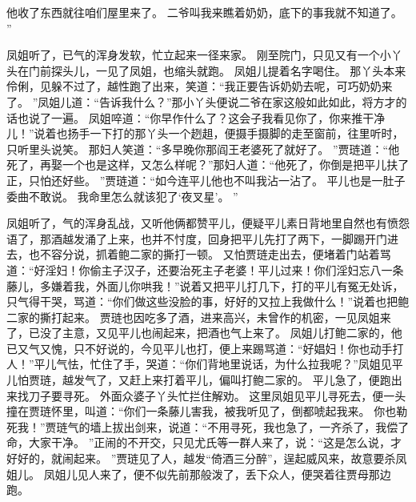 他收了东西就往咱们屋里来了。
二爷叫我来瞧着奶奶，底下的事我就不知道了。
”\par
凤姐听了，已气的浑身发软，忙立起来一径来家。
刚至院门，只见又有一个小丫头在门前探头儿，一见了凤姐，也缩头就跑。
凤姐儿提着名字喝住。
那丫头本来伶俐，见躲不过了，越性跑了出来，笑道：“我正要告诉奶奶去呢，可巧奶奶来了。
”凤姐儿道：“告诉我什么？”那小丫头便说二爷在家这般如此如此，将方才的话也说了一遍。
凤姐啐道：“你早作什么了？这会子我看见你了，你来推干净儿！”说着也扬手一下打的那丫头一个趔趄，便摄手摄脚的走至窗前，往里听时，只听里头说笑。
那妇人笑道：“多早晚你那阎王老婆死了就好了。
”贾琏道：“他死了，再娶一个也是这样，又怎么样呢？”那妇人道：“他死了，你倒是把平儿扶了正，只怕还好些。
”贾琏道：“如今连平儿他也不叫我沾一沾了。
平儿也是一肚子委曲不敢说。
我命里怎么就该犯了‘夜叉星’。
”\par
凤姐听了，气的浑身乱战，又听他俩都赞平儿，便疑平儿素日背地里自然也有愤怨语了，那酒越发涌了上来，也并不忖度，回身把平儿先打了两下，一脚踢开门进去，也不容分说，抓着鲍二家的撕打一顿。
又怕贾琏走出去，便堵着门站着骂道：“好淫妇！你偷主子汉子，还要治死主子老婆！平儿过来！你们淫妇忘八一条藤儿，多嫌着我，外面儿你哄我！”说着又把平儿打几下，打的平儿有冤无处诉，只气得干哭，骂道：“你们做这些没脸的事，好好的又拉上我做什么！”说着也把鲍二家的撕打起来。
贾琏也因吃多了酒，进来高兴，未曾作的机密，一见凤姐来了，已没了主意，又见平儿也闹起来，把酒也气上来了。
凤姐儿打鲍二家的，他已又气又愧，只不好说的，今见平儿也打，便上来踢骂道：“好娼妇！你也动手打人！”平儿气怯，忙住了手，哭道：“你们背地里说话，为什么拉我呢？”凤姐见平儿怕贾琏，越发气了，又赶上来打着平儿，偏叫打鲍二家的。
平儿急了，便跑出来找刀子要寻死。
外面众婆子丫头忙拦住解劝。
这里凤姐见平儿寻死去，便一头撞在贾琏怀里，叫道：“你们一条藤儿害我，被我听见了，倒都唬起我来。
你也勒死我！”贾琏气的墙上拔出剑来，说道：“不用寻死，我也急了，一齐杀了，我偿了命，大家干净。
”正闹的不开交，只见尤氏等一群人来了，说：“这是怎么说，才好好的，就闹起来。
”贾琏见了人，越发“倚酒三分醉”，逞起威风来，故意要杀凤姐儿。
凤姐儿见人来了，便不似先前那般泼了，丢下众人，便哭着往贾母那边跑。
\par
